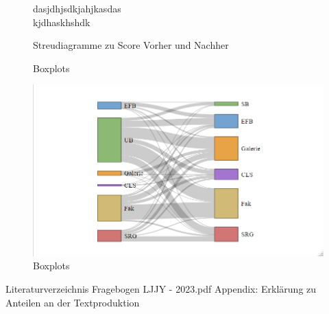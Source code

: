 \documentclass[11pt, a4paper]{article}
\begin{document}
\newpage
\begin{figure}
{\centering 
\vspace{-2cm}
\caption{Streudiagramme zu Score Vorher und Nachher}}
 dasjdhjsdkjahjkasdas\\
kjdhaskhshdk\\

\end{figure}


\leavevmode

\begin{figure}
	\vspace{-1.5cm}
	\centering 
	\vspace{-1cm}
	\caption{Boxplots}
\end{figure}


\leavevmode

\begin{figure}
	\vspace{-1.5cm}
	\centering \includegraphics[scale=0.65]{Sankey.png}
	
	\vspace{-1cm}
	\caption{Boxplots}
\end{figure}


\newpage
 Literaturverzeichnis
\newpage 
 {Fragebogen LJJY - 2023.pdf}
\newpage Appendix: Erklärung zu Anteilen an der Textproduktion
\end{document}
